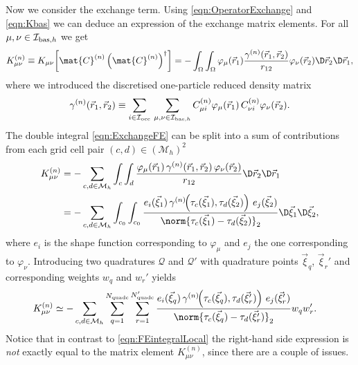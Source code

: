 Now we consider the exchange term.
Using \eqref{eqn:OperatorExchange} and \eqref{eqn:Kbas} we can
deduce an expression of the exchange matrix elements.
For all $\mu, \nu \in \mathcal{I}_{\text{bas},h}$ we get
\begin{equation}
	\label{eqn:ExchangeFE}
	K^{(n)}_{\mu\nu} \equiv
	K_{\mu\nu}\!\left[\mat{C}^{(n)} \left(\mat{C}^{(n)}\right)^\dagger\right]
	= -\int_\Omega \int_\Omega
		\varphi_\mu(\vec{r}_1) \frac{\gamma^{(n)}(\vec{r}_1, \vec{r}_2)}
		{ r_{12} }\varphi_\nu(\vec{r}_2) \D \vec{r}_2 \D \vec{r}_1,
\end{equation}
where we introduced the discretised one-particle reduced density matrix
\begin{equation}
	\gamma^{(n)}(\vec{r}_1, \vec{r}_2)
	\equiv \sum_{i\in\mathcal{I}_\text{occ}} \, \sum_{\mu,\nu\in\mathcal{I}_{\text{bas},h}}
	C^{(n)}_{\mu i} \varphi_\mu(\vec{r}_1) \, C^{(n)}_{\nu i} \varphi_\nu(\vec{r}_2).
	\label{eqn:DensityMatrixFE}
\end{equation}
The double integral \eqref{eqn:ExchangeFE}
can be split into a sum of contributions from each grid cell pair
$(c,d) \in \left( \mathcal{M}_h \right)^2$
\begin{align*}
	K^{(n)}_{\mu\nu}
	&= -\sum_{c,d \in \mathcal{M}_h}
		\int_{c} \int_{d}
		\frac{\varphi_\mu(\vec{r}_1) \, \gamma^{(n)}(\vec{r}_1, \vec{r}_2)
			\,\varphi_\nu(\vec{r}_2)}
		{r_{12}} \D \vec{r}_2 \D \vec{r}_1 \\
	&= -\sum_{c,d \in \mathcal{M}_h}
		\int_{c_0} \int_{c_0}
		\frac{e_i(\vec{\xi}_1)\,
			\gamma^{(n)}\!\!\left(\tau_c(\vec{\xi}_1), \tau_d(\vec{\xi}_2)\right)
			\,e_j(\vec{\xi}_2)}
		{\norm{\tau_c(\vec{\xi}_1) - \tau_d(\vec{\xi}_2)}_2}
		\D \vec{\xi}_1 \D \vec{\xi}_2,
\end{align*}
where $e_i$ is the shape function corresponding to $\varphi_\mu$
and $e_j$ the one corresponding to $\varphi_\nu$.
Introducing two quadratures $\mathcal{Q}$ and $\mathcal{Q}'$
with quadrature points $\vec{\xi}_q$, $\vec{\xi}_r'$
and corresponding weights $w_q$ and $w_r'$ yields
\begin{align*}
	K^{(n)}_{\mu\nu}
		&\simeq -\sum_{c,d \in \mathcal{M}_h}
		\sum_{q=1}^{\Nquadc}
		\sum_{r=1}^{\Nquadc'}
		\frac{
			e_i(\vec{\xi}_q) \,
			\gamma^{(n)}\!\!\left(\tau_c(\vec{\xi}_q), \tau_d(\vec{\xi}'_r)\right)
			\,e_j(\vec{\xi}'_r)}
		{\norm{\tau_c(\vec{\xi}_q) - \tau_d(\vec{\xi}'_r)}_2}
		w_q w_r'.
\end{align*}
Notice that in contrast to \eqref{eqn:FEintegralLocal}
the right-hand side expression is \emph{not} exactly equal to the matrix element
$K^{(n)}_{\mu\nu}$,
since there are a couple of issues.
